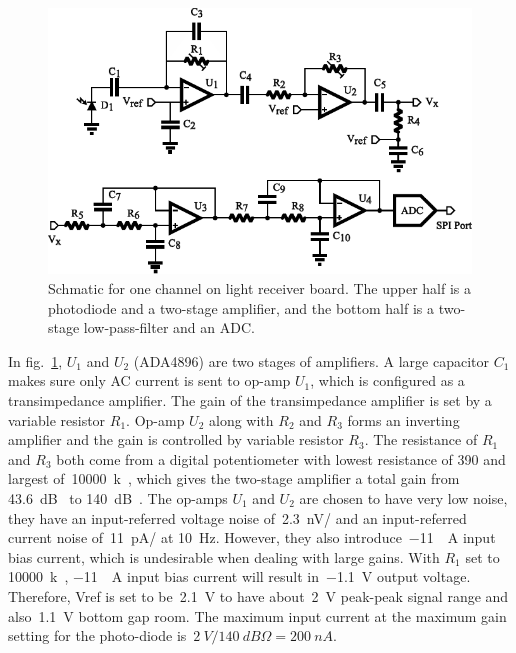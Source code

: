 \begin{figure}[H]
\centerline{\includegraphics[scale=0.8]{4-ANC_Sys/ReceiverSch.pdf}}
\caption{Schmatic for one channel on light receiver board.  The upper half is a photodiode and a two-stage amplifier, and the bottom half is a two-stage low-pass-filter and an ADC.}
\label{fig_ReceiverSch}
\end{figure}

In fig.~\ref{fig_ReceiverSch}, $U_1$ and $U_2$ (ADA4896) are two stages of amplifiers.  A large capacitor $C_1$ makes sure only AC current is sent to op-amp $U_1$, which is configured as a transimpedance amplifier.  The gain of the transimpedance amplifier is set by a variable resistor $R_1$.  Op-amp $U_2$ along with $R_2$ and $R_3$ forms an inverting amplifier and the gain is controlled by variable resistor $R_3$.  The resistance of $R_1$ and $R_3$ both come from a digital potentiometer with  lowest resistance of \qty{390}{\Omega} and largest of~\qty{10000}{k\Omega}, which gives the two-stage amplifier a total gain from \qty{43.6}{dB\Omega} to \qty{140}{dB\Omega}.  The op-amps $U_1$ and $U_2$ are chosen to have very low noise, they have an input-referred voltage noise of~\qty{2.3}{nV/\sqrthz} and an input-referred current noise of~\qty{11}{pA/\sqrthz} at \qty{10}{\Hz}.  However, they also introduce~\qty{-11}{\mu A} input bias current, which is undesirable when dealing with large gains.  With $R_1$ set to \qty{10000}{k\Omega}, \qty{-11}{\mu A} input bias current will result in~\qty{-1.1}{V} output voltage. Therefore, Vref is set to be~\qty{2.1}{V} to have about~\qty{2}{V} peak-peak signal range and also~\qty{1.1}{V} bottom gap room.  The maximum input current at the maximum gain setting for the photo-diode is~$\qty{2}{V}/\qty{140}{dB\Omega}=\qty{200}{nA}$.

